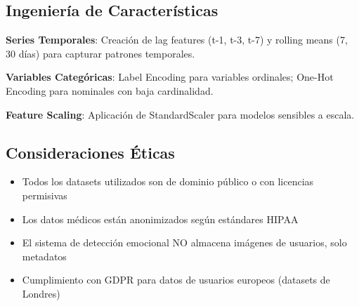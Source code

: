 \subsection{Ingeniería de Características}

\textbf{Series Temporales}: Creación de lag features (t-1, t-3, t-7) y rolling means (7, 30 días) para capturar patrones temporales.

\textbf{Variables Categóricas}: Label Encoding para variables ordinales; One-Hot Encoding para nominales con baja cardinalidad.

\textbf{Feature Scaling}: Aplicación de StandardScaler para modelos sensibles a escala.

\subsection{Consideraciones Éticas}

\begin{itemize}
    \item Todos los datasets utilizados son de dominio público o con licencias permisivas
    \item Los datos médicos están anonimizados según estándares HIPAA
    \item El sistema de detección emocional NO almacena imágenes de usuarios, solo metadatos
    \item Cumplimiento con GDPR para datos de usuarios europeos (datasets de Londres)
\end{itemize}

